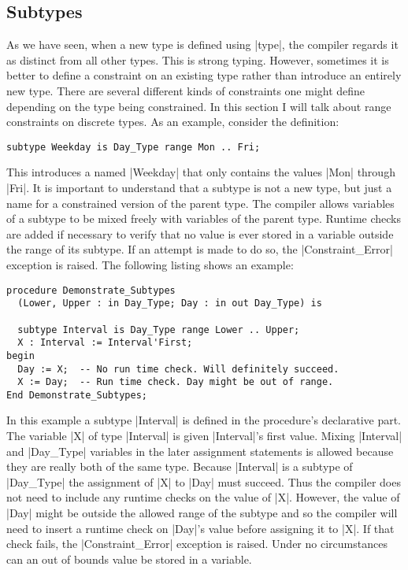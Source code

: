 \subsection{Subtypes}

As we have seen, when a new type is defined using |type|, the compiler regards it as distinct
from all other types. This is strong typing. However, sometimes it is better to define a
constraint on an existing type rather than introduce an entirely new type. There are several
different kinds of constraints one might define depending on the type being constrained. In this
section I will talk about range constraints on discrete types. As an example, consider the
definition:

\begin{lstlisting}
subtype Weekday is Day_Type range Mon .. Fri;
\end{lstlisting}

\noindent This introduces a  named |Weekday| that only contains the values
|Mon| through |Fri|. It is important to understand that a subtype is not a new type, but just a
name for a constrained version of the parent type. The compiler allows variables of a subtype to
be mixed freely with variables of the parent type. Runtime checks are added if necessary to
verify that no value is ever stored in a variable outside the range of its subtype. If an
attempt is made to do so, the |Constraint_Error| exception is raised. The following listing
shows an example:

\begin{lstlisting}
procedure Demonstrate_Subtypes
  (Lower, Upper : in Day_Type; Day : in out Day_Type) is

  subtype Interval is Day_Type range Lower .. Upper;
  X : Interval := Interval'First;
begin
  Day := X;  -- No run time check. Will definitely succeed.
  X := Day;  -- Run time check. Day might be out of range.
End Demonstrate_Subtypes;
\end{lstlisting}

In this example a subtype |Interval| is defined in the procedure's declarative part. The
variable |X| of type |Interval| is given |Interval|'s first value. Mixing |Interval| and
|Day_Type| variables in the later assignment statements is allowed because they are really both
of the same type. Because |Interval| is a subtype of |Day_Type| the assignment of |X| to |Day|
must succeed. Thus the compiler does not need to include any runtime checks on the value of |X|.
However, the value of |Day| might be outside the allowed range of the subtype and so the
compiler will need to insert a runtime check on |Day|'s value before assigning it to |X|. If
that check fails, the |Constraint_Error| exception is raised. Under no circumstances can an out
of bounds value be stored in a variable.

